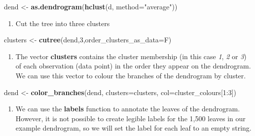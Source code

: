 \documentclass[]{book}
\newenvironment{Shaded}{\begin{snugshade}}{\end{snugshade}}
\newcommand{\KeywordTok}[1]{\textcolor[rgb]{0.13,0.29,0.53}{\textbf{{#1}}}}
\newcommand{\DataTypeTok}[1]{\textcolor[rgb]{0.13,0.29,0.53}{{#1}}}
\newcommand{\DecValTok}[1]{\textcolor[rgb]{0.00,0.00,0.81}{{#1}}}
\newcommand{\StringTok}[1]{\textcolor[rgb]{0.31,0.60,0.02}{{#1}}}
\newcommand{\NormalTok}[1]{{#1}}
\providecommand{\tightlist}{%
  \setlength{\itemsep}{0pt}\setlength{\parskip}{0pt}}
\theoremstyle{definition}
\theoremstyle{definition}
\theoremstyle{definition}
\theoremstyle{remark}
\begin{document}
\begin{Shaded}
\begin{Highlighting}[]
\NormalTok{dend <-}\StringTok{ }\KeywordTok{as.dendrogram}\NormalTok{(}\KeywordTok{hclust}\NormalTok{(d, }\DataTypeTok{method=}\StringTok{"average"}\NormalTok{))}
\end{Highlighting}
\end{Shaded}

\begin{enumerate}
\def\labelenumi{\arabic{enumi}.}
\setcounter{enumi}{5}
\tightlist
\item
  Cut the tree into three clusters
\end{enumerate}

\begin{Shaded}
\begin{Highlighting}[]
\NormalTok{clusters <-}\StringTok{ }\KeywordTok{cutree}\NormalTok{(dend,}\DecValTok{3}\NormalTok{,}\DataTypeTok{order_clusters_as_data=}\NormalTok{F)}
\end{Highlighting}
\end{Shaded}

\begin{enumerate}
\def\labelenumi{\arabic{enumi}.}
\setcounter{enumi}{6}
\tightlist
\item
  The vector \textbf{clusters} contains the cluster membership (in this
  case \emph{1}, \emph{2} or \emph{3}) of each observation (data point)
  in the order they appear on the dendrogram. We can use this vector to
  colour the branches of the dendrogram by cluster.
\end{enumerate}

\begin{Shaded}
\begin{Highlighting}[]
\NormalTok{dend <-}\StringTok{ }\KeywordTok{color_branches}\NormalTok{(dend, }\DataTypeTok{clusters=}\NormalTok{clusters, }\DataTypeTok{col=}\NormalTok{cluster_colours[}\DecValTok{1}\NormalTok{:}\DecValTok{3}\NormalTok{])}
\end{Highlighting}
\end{Shaded}

\begin{enumerate}
\def\labelenumi{\arabic{enumi}.}
\setcounter{enumi}{7}
\tightlist
\item
  We can use the \textbf{labels} function to annotate the leaves of the
  dendrogram. However, it is not possible to create legible labels for
  the 1,500 leaves in our example dendrogram, so we will set the label
  for each leaf to an empty string.
\end{enumerate}
\end{document}
